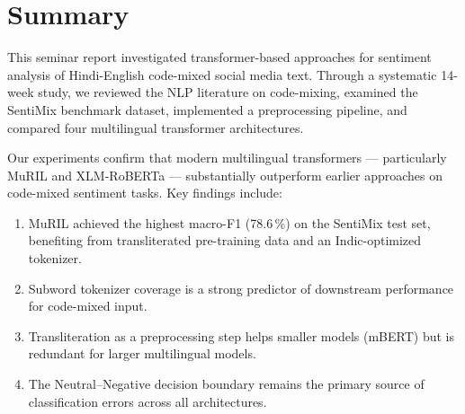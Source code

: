 \section{Summary}

This seminar report investigated transformer-based approaches for sentiment analysis of Hindi-English code-mixed social media text. Through a systematic 14-week study, we reviewed the NLP literature on code-mixing, examined the SentiMix benchmark dataset, implemented a preprocessing pipeline, and compared four multilingual transformer architectures.

Our experiments confirm that modern multilingual transformers — particularly MuRIL and XLM-RoBERTa — substantially outperform earlier approaches on code-mixed sentiment tasks. Key findings include:

\begin{enumerate}[nosep,itemsep=3pt]
  \item MuRIL achieved the highest macro-F1 (78.6\,\%) on the SentiMix test set, benefiting from transliterated pre-training data and an Indic-optimized tokenizer.
  \item Subword tokenizer coverage is a strong predictor of downstream performance for code-mixed input.
  \item Transliteration as a preprocessing step helps smaller models (mBERT) but is redundant for larger multilingual models.
  \item The Neutral--Negative decision boundary remains the primary source of classification errors across all architectures.
\end{enumerate}
